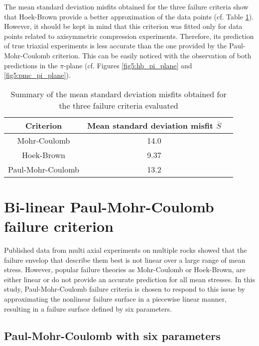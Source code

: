 The mean standard deviation misfits obtained for the three failure criteria show that Hoek-Brown provide a better approximation of the data points (cf. Table \ref{tb5:stand_dev}). However, it should be kept in mind that this criterion was fitted only for data points related to axisymmetric compression experiments. Therefore, its prediction of true triaxial experiments is less accurate than the one provided by the Paul-Mohr-Coulomb criterion. This can be easily noticed with the observation of both predictions in the $\pi$-plane (cf. Figures \ref{fig5:hb_pi_plane} and \ref{fig5:pmc_pi_plane}). 

\begin{table}
    \centering
    \begin{tabular}{ccc}
        \hline 
        Criterion & Mean standard deviation misfit $\bar{S}$ \\
        \hline
        \hline
        Mohr-Coulomb & 14.0 \\
        Hoek-Brown & 9.37 \\
        Paul-Mohr-Coulomb & 13.2 \\
        \hline
    \end{tabular}
    \captionsetup{justification=centering}
    \caption{Summary of the mean standard deviation misfits obtained for the three failure criteria evaluated}
    \label{tb5:stand_dev}
\end{table}

\section{Bi-linear Paul-Mohr-Coulomb failure criterion}\label{ch5:PMC}

Published data from multi axial experiments on multiple rocks showed that the failure envelop that describe them best is not linear over a large range of mean stress. However, popular failure theories as Mohr-Coulomb or Hoek-Brown, are either linear or do not provide an accurate prediction for all mean stresses. In this study, Paul-Mohr-Coulomb failure criteria is chosen to respond to this issue by approximating the nonlinear failure surface in a piecewise linear manner, resulting in a failure surface defined by six parameters.

\subsection{Paul-Mohr-Coulomb with six parameters}

